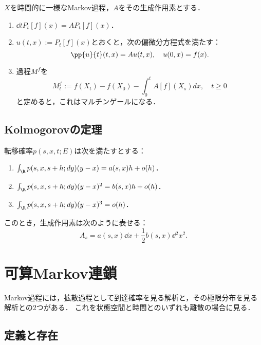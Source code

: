 \documentclass[uplatex,dvipdfmx]{jsreport}
\begin{document}
\begin{proposition}
    $X$を時間的に一様なMarkov過程，$A$をその生成作用素とする．
    \begin{enumerate}
        \item $\dd{}{t}P_t[f](x)=AP_t[f](x)$．
        \item $u(t,x):=P_t[f](x)$とおくと，次の偏微分方程式を満たす：
        \[\pp{u}{t}(t,x)=Au(t,x),\quad u(0,x)=f(x).\]
        \item 過程$M^f$を
        \[M^f_t:=f(X_t)-f(X_0)-\int^t_0A[f](X_s)dx,\quad t\ge0\]
        と定めると，これはマルチンゲールになる．
    \end{enumerate}
\end{proposition}

\subsection{Kolmogorovの定理}

\begin{theorem}
    転移確率$p(s,x,t;E)$は次を満たすとする：
    \begin{enumerate}
        \item $\int_\R p(s,x,s+h;dy)(y-x)=a(s,x)h+o(h)$．
        \item $\int_\R p(s,x,s+h;dy)(y-x)^2=b(s,x)h+o(h)$．
        \item $\int_\R p(s,x,s+h;dy)(y-x)^3=o(h)$．
    \end{enumerate}
    このとき，生成作用素は次のように表せる：
    \[A_s=a(s,x)\dd{}{x}+\frac{1}{2}b(s,x)\dd{^2}{x^2}.\]
\end{theorem}

\section{可算Markov連鎖}

\begin{tcolorbox}[colframe=ForestGreen, colback=ForestGreen!10!white,breakable,colbacktitle=ForestGreen!40!white,coltitle=black,fonttitle=\bfseries\sffamily,
title=]
    Markov過程には，拡散過程として到達確率を見る解析と，その極限分布を見る解析との2つがある．
    これを状態空間と時間とのいずれも離散の場合に見る．
\end{tcolorbox}

\subsection{定義と存在}
\end{document}
